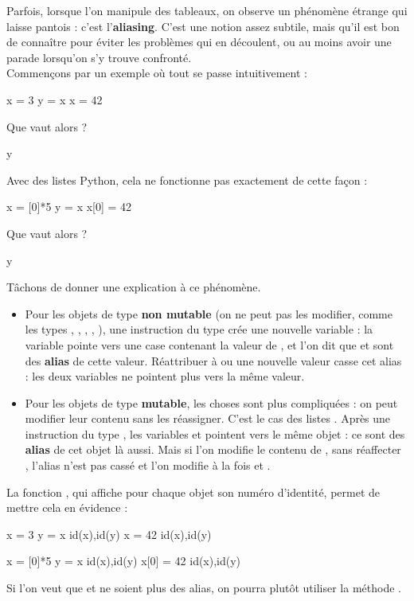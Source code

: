 Parfois, lorsque l'on manipule des tableaux, on observe un phénomène étrange qui laisse pantois : 
c'est l'\textbf{aliasing}. C'est une notion assez subtile, mais qu'il est bon de connaître pour 
éviter les problèmes qui en découlent, ou au moins avoir une parade lorsqu'on s'y trouve 
confronté.\\


Commençons par un exemple où tout se passe intuitivement :
\begin{pyconsole}
x = 3
y = x
x = 42
\end{pyconsole}

Que vaut alors  ? 
\begin{pyconsole}
y
\end{pyconsole}

Avec des listes Python, cela ne fonctionne pas exactement de cette façon : 
\begin{pyconsole}
x = [0]*5
y = x
x[0] = 42
\end{pyconsole}
Que vaut alors  ? 
\begin{pyconsole}
y
\end{pyconsole}
Tâchons de donner une explication à ce phénomène.
\begin{itemize}
  \item Pour les objets de type \textbf{non mutable} (on ne peut pas les modifier, comme les types 
  , , , , ), une instruction du type  
crée une nouvelle variable : la variable  pointe vers une case contenant la valeur de 
, et l'on dit que  et  sont des \textbf{alias} de cette valeur. Réattribuer à 
 ou  une nouvelle valeur casse cet alias : les deux variables ne pointent plus vers la 
même valeur.
  \item Pour les objets de type \textbf{mutable}, les choses sont plus compliquées : on peut modifier 
leur contenu sans les réassigner. C'est le cas des listes \python. Après une instruction du type 
 , les variables  et  pointent vers le même objet : ce sont des 
\textbf{alias} de cet objet là aussi. Mais si l'on modifie le contenu de , sans réaffecter 
, l'alias n'est pas cassé et l'on modifie à la fois  et .
\end{itemize}

La fonction , qui affiche pour chaque objet son \og numéro d'identité\fg, permet de 
mettre cela en évidence :
\begin{multicols}{2}
\begin{pyconsole}
x = 3
y = x
id(x),id(y)
x = 42
id(x),id(y)
\end{pyconsole}


\begin{pyconsole}
x = [0]*5
y = x
id(x),id(y)
x[0] = 42
id(x),id(y)
\end{pyconsole}

\end{multicols}
Si l'on veut que  et  ne soient plus des alias, on pourra plutôt utiliser la méthode 
.

